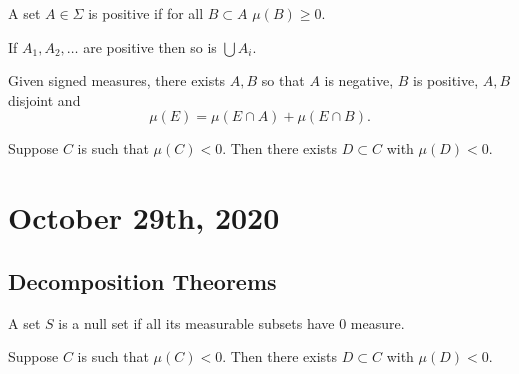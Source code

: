 \documentclass[11pt]{scrartcl}
\begin{document}
\begin{definition} A set $A \in \Sigma$ is positive if for all $B \subset A$ $\mu(B) \ge 0$.
\end{definition}
\begin{lemma} If $A_1, A_2, \dots$ are positive then so is $\bigcup A_i$.  
\end{lemma}



\begin{thm} Given signed measures, there exists $A, B$ so that $A$ is negative, $B$ is positive, $A, B$ disjoint and 
$$\mu(E) = \mu(E\cap A) + \mu(E \cap B).$$
\end{thm}
\begin{lemma} Suppose $C$ is such that $\mu(C) < 0$.  Then there exists $D \subset C$ with $\mu(D) < 0$.
\end{lemma}
\pagebreak
\section{October 29th, 2020}
\subsection{Decomposition Theorems}

\begin{definition} A set $S$ is a null set if all its measurable subsets have $0$ measure.
\end{definition}

\begin{lemma} Suppose $C$ is such that $\mu(C) < 0$.  Then there exists $D \subset C$ with $\mu(D) < 0$.
\end{lemma}
\end{document}
